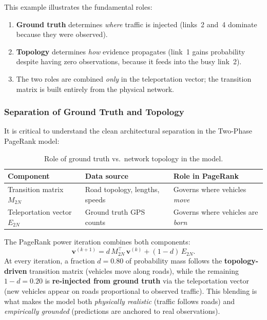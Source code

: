 \documentclass[12pt,a4paper]{article}
\theoremstyle{definition}
\theoremstyle{plain}
\begin{document}
\begin{insight}
  This example illustrates the fundamental roles:
  \begin{enumerate}[label=(\roman*)]
    \item \textbf{Ground truth} determines \emph{where} traffic is injected
      (links~2 and~4 dominate because they were observed).
    \item \textbf{Topology} determines \emph{how} evidence propagates (link~1
      gains probability despite having zero observations, because it feeds
      into the busy link~2).
    \item The two roles are combined \emph{only} in the teleportation vector;
      the transition matrix is built entirely from the physical network.
  \end{enumerate}
\end{insight}

\subsubsection{Separation of Ground Truth and Topology}

It is critical to understand the clean architectural separation in the Two-Phase
PageRank model:

\begin{table}[H]
  \centering
  \caption{Role of ground truth vs.\ network topology in the model.}
  \label{tab:roles}
  \begin{tabular}{@{}lll@{}}
    \toprule
    Component & Data source & Role in PageRank\\
    \midrule
    Transition matrix $M_{2N}$ & Road topology, lengths, speeds
      & Governs where vehicles \emph{move}\\
    Teleportation vector $E_{2N}$ & Ground truth GPS counts
      & Governs where vehicles are \emph{born}\\
    \bottomrule
  \end{tabular}
\end{table}

The PageRank power iteration combines both components:
\begin{equation}
  \mathbf{v}^{(k+1)} = d\,M_{2N}^{\top}\,\mathbf{v}^{(k)}
  + (1-d)\,E_{2N}.
  \label{eq:power_roles}
\end{equation}
At every iteration, a fraction $d = 0.80$ of probability mass follows the
\textbf{topology-driven} transition matrix (vehicles move along roads), while the
remaining $1 - d = 0.20$ is \textbf{re-injected from ground truth} via the
teleportation vector (new vehicles appear on roads proportional to observed
traffic). This blending is what makes the model both \emph{physically realistic}
(traffic follows roads) and \emph{empirically grounded} (predictions are anchored
to real observations).
\end{document}
